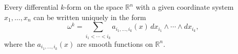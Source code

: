 Every differential $k$-form on the space $\mathbb{R}^n$ with a given coordinate system $x_1, \ldots, x_n$ can be written uniquely in the form
$$\omega^k = \sum_{i_1 < \cdots < i_k} a_{i_1, \ldots, i_k}(x)\, dx_{i_1} \wedge \cdots \wedge dx_{i_k},$$
where the $a_{i_1, \ldots, i_k}(x)$ are smooth functions on $\mathbb{R}^n$.
